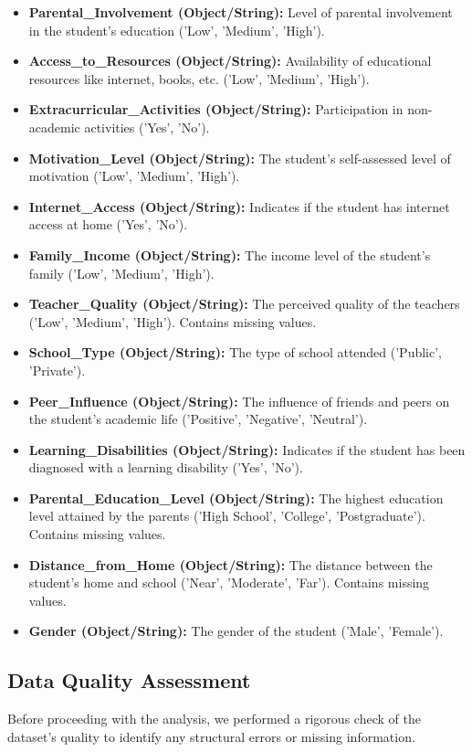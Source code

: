 \documentclass[a4paper,12pt]{article}
\begin{document}
\begin{itemize}
    \item \textbf{Parental\_Involvement (Object/String):} Level of parental involvement in the student's education ('Low', 'Medium', 'High').
    \item \textbf{Access\_to\_Resources (Object/String):} Availability of educational resources like internet, books, etc. ('Low', 'Medium', 'High').
    \item \textbf{Extracurricular\_Activities (Object/String):} Participation in non-academic activities ('Yes', 'No').
    \item \textbf{Motivation\_Level (Object/String):} The student's self-assessed level of motivation ('Low', 'Medium', 'High').
    \item \textbf{Internet\_Access (Object/String):} Indicates if the student has internet access at home ('Yes', 'No').
    \item \textbf{Family\_Income (Object/String):} The income level of the student's family ('Low', 'Medium', 'High').
    \item \textbf{Teacher\_Quality (Object/String):} The perceived quality of the teachers ('Low', 'Medium', 'High'). Contains missing values.
    \item \textbf{School\_Type (Object/String):} The type of school attended ('Public', 'Private').
    \item \textbf{Peer\_Influence (Object/String):} The influence of friends and peers on the student's academic life ('Positive', 'Negative', 'Neutral').
    \item \textbf{Learning\_Disabilities (Object/String):} Indicates if the student has been diagnosed with a learning disability ('Yes', 'No').
    \item \textbf{Parental\_Education\_Level (Object/String):} The highest education level attained by the parents ('High School', 'College', 'Postgraduate'). Contains missing values.
    \item \textbf{Distance\_from\_Home (Object/String):} The distance between the student's home and school ('Near', 'Moderate', 'Far'). Contains missing values.
    \item \textbf{Gender (Object/String):} The gender of the student ('Male', 'Female').
\end{itemize}

\subsection{Data Quality Assessment}
Before proceeding with the analysis, we performed a rigorous check of the dataset's quality to identify any structural errors or missing information.
\end{document}
